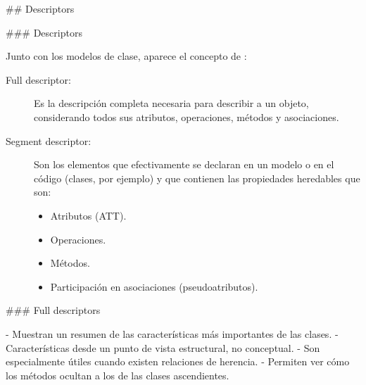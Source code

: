 ## Descriptors

### Descriptors


Junto con los modelos de clase, aparece el concepto de :\newline

\begin{description}
\item[Full descriptor:] Es la descripción completa necesaria para describir a un objeto, considerando
todos sus atributos, operaciones, métodos y asociaciones.
\item[Segment descriptor:] Son los elementos que efectivamente se declaran en un modelo o en el código
(clases, por ejemplo) y que contienen las propiedades heredables que son:
    \begin{footnotesize}
    \begin{itemize}
        \item Atributos (\textsc{ATT}).
        \item Operaciones.
        \item Métodos.
        \item Participación en asociaciones (pseudoatributos).
    \end{itemize}
    \end{footnotesize}
\end{description}

### Full descriptors


- Muestran un resumen de las características más importantes de las clases.
    - Características desde un punto de vista estructural, no conceptual.
- Son especialmente útiles cuando existen relaciones de herencia.
    - Permiten ver cómo los métodos  ocultan a los de
    las clases ascendientes.

